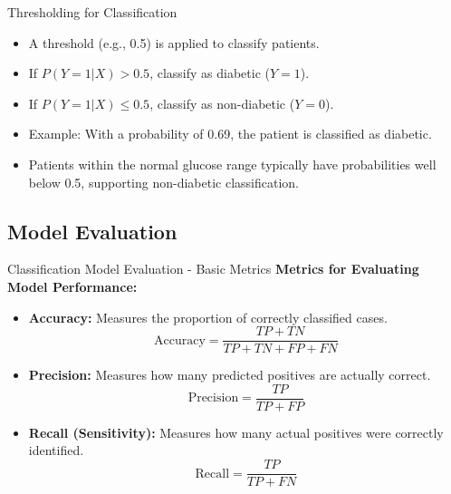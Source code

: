 \documentclass[aspectratio=169,xcolor=dvipsnames]{beamer}
\begin{document}
\begin{frame}{Thresholding for Classification}
    \begin{itemize}
        \item A threshold (e.g., 0.5) is applied to classify patients.
        \item If \( P(Y=1 | X) > 0.5 \), classify as diabetic (\( Y=1 \)).
        \item If \( P(Y=1 | X) \leq 0.5 \), classify as non-diabetic (\( Y=0 \)).
        \item Example: With a probability of 0.69, the patient is classified as diabetic.
        \item Patients within the normal glucose range typically have probabilities well below 0.5, supporting non-diabetic classification.
    \end{itemize}
\end{frame}

\subsection{Model Evaluation}
\begin{frame}{Classification Model Evaluation - Basic Metrics}
    \textbf{Metrics for Evaluating Model Performance:}
    \begin{itemize}
        \item \textbf{Accuracy:} Measures the proportion of correctly classified cases.
        \begin{equation}
            \text{Accuracy} = \frac{TP + TN}{TP + TN + FP + FN}
        \end{equation}
        \item \textbf{Precision:} Measures how many predicted positives are actually correct.
        \begin{equation}
            \text{Precision} = \frac{TP}{TP + FP}
        \end{equation}
        \item \textbf{Recall (Sensitivity):} Measures how many actual positives were correctly identified.
        \begin{equation}
            \text{Recall} = \frac{TP}{TP + FN}
        \end{equation}
    \end{itemize}
\end{frame}
\end{document}
